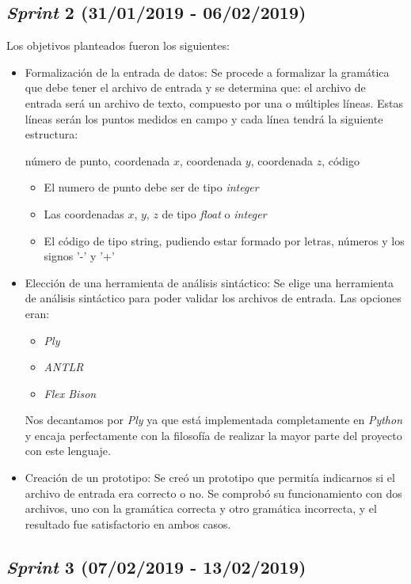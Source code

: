 \subsection{\emph{Sprint} 2 (31/01/2019 - 06/02/2019)}

Los objetivos planteados fueron los siguientes:

\begin{itemize}
\item Formalización de la entrada de datos: Se procede a formalizar la gramática que debe tener el archivo de entrada y se determina que:
el archivo de entrada será un archivo de texto, compuesto por una o múltiples líneas. Estas líneas serán los puntos medidos en campo y cada línea tendrá la siguiente estructura:

número de punto, coordenada $x$, coordenada $y$, coordenada $z$, código
\begin{itemize}
\item El numero de punto debe ser de tipo \emph{integer}
\item Las coordenadas $x$, $y$, $z$ de tipo \emph{float} o \emph{integer}
\item El código de tipo string, pudiendo estar formado por letras, números y los signos '-' y '+'
\end{itemize}

\item Elección de una herramienta de análisis sintáctico: Se elige una herramienta de análisis sintáctico para poder validar los archivos de entrada. Las opciones eran:
\begin{itemize}
\item \emph{Ply}
\item \emph{ANTLR}
\item \emph{Flex Bison}
\end{itemize}
Nos decantamos por \emph{Ply} ya que está implementada completamente
en \emph{Python} y encaja perfectamente con la filosofía de realizar la mayor parte del proyecto con este lenguaje.

\item Creación de un prototipo: Se creó un prototipo que permitía indicarnos si el archivo de entrada era correcto o no. Se comprobó su funcionamiento con dos archivos, uno con la gramática correcta y otro gramática incorrecta, y el resultado fue satisfactorio en ambos casos. 

\end{itemize}


\subsection{\emph{Sprint} 3 (07/02/2019 - 13/02/2019)}

